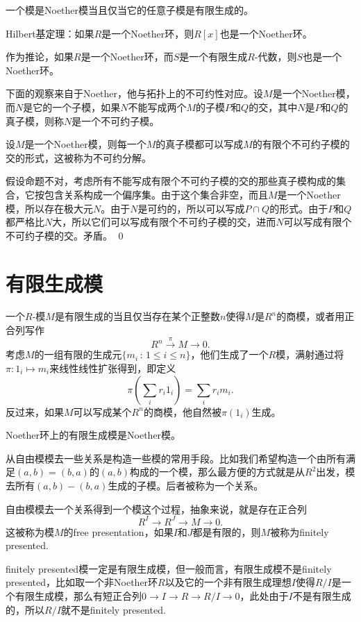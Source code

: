 \pro 一个模是Noether模当且仅当它的任意子模是有限生成的。\notprove

\theo Hilbert基定理：如果$R$是一个Noether环，则$R[x]$也是一个Noether环。\notprove

作为推论，如果$R$是一个Noether环，而$S$是一个有限生成$R$-代数，则$S$也是一个Noether环。

\para 下面的观察来自于Noether，他与拓扑上的不可约性对应。设$M$是一个Noether模，而$N$是它的一个子模，如果$N$不能写成两个$M$的子模$P$和$Q$的交，其中$N$是$P$和$Q$的真子模，则称$N$是一个不可约子模。

\pro \label{irrde}设$M$是一个Noether模，则每一个$M$的真子模都可以写成$M$的有限个不可约子模的交的形式，这被称为不可约分解。

\proof
	假设命题不对，考虑所有不能写成有限个不可约子模的交的那些真子模构成的集合，它按包含关系构成一个偏序集。由于这个集合非空，而且$M$是一个Noether模，所以存在极大元$N$。由于$N$是可约的，所以可以写成$P\cap Q$的形式。由于$P$和$Q$都严格比$N$大，所以它们可以写成有限个不可约子模的交，进而$N$可以写成有限个不可约子模的交。矛盾。
\qed

\section{有限生成模}

\para 一个$R$-模$M$是有限生成的当且仅当存在某个正整数$n$使得$M$是$R^n$的商模，或者用正合列写作
\[
	R^n \xrightarrow{\pi} M\to 0.
\]
考虑$M$的一组有限的生成元$\{m_i\,:\, 1\leq i\leq n\}$，他们生成了一个$R$模，满射通过将$\pi:1_i\mapsto m_i$来线性线性扩张得到，即定义
\[
	\pi\left(\sum_i r_i 1_i\right)=\sum_i r_i m_i.
\]
反过来，如果$M$可以写成某个$R^n$的商模，他自然被$\pi(1_i)$生成。

\pro Noether环上的有限生成模是Noether模。

\para 从自由模模去一些关系是构造一些模的常用手段。比如我们希望构造一个由所有满足$(a,b)=(b,a)$的$(a,b)$构成的一个模，那么最方便的方式就是从$R^2$出发，模去所有$(a,b)-(b,a)$生成的子模。后者被称为一个关系。

自由模模去一个关系得到一个模这个过程，抽象来说，就是存在正合列
\[
	R^I\to R^J \to M\to 0.
\]
这被称为模$M$的free presentation，如果$I$和$J$都是有限的，则$M$被称为finitely presented.

finitely presented模一定是有限生成模，但一般而言，有限生成模不是finitely presented，比如取一个非Noether环$R$以及它的一个非有限生成理想$I$使得$R/I$是一个有限生成模，那么有短正合列$0\to I\to R \to R/I\to 0$，此处由于$I$不是有限生成的，所以$R/I$就不是finitely presented.

